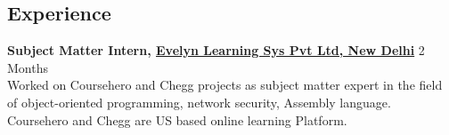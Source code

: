 \documentclass[margin, centered]{res}
\begin{document}
\begin{resume}
\section{Experience}
\textbf{Subject Matter Intern, \href{https://evelynlearning.com/}{Evelyn Learning Sys Pvt Ltd, New Delhi}} \hfill 2 Months\\
Worked on Coursehero and Chegg projects as subject matter expert in the field of object-oriented programming, network security, Assembly language. Coursehero and Chegg are US based online learning Platform.  \\
\\


\end{resume}
\end{document}
